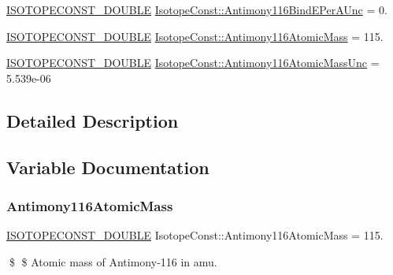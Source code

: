 \begin{DoxyCompactItemize}
\mbox{\hyperlink{group___isotope_const-_macros_ga8f45a7272ce02c0b4c65c44636ed719a}{I\+S\+O\+T\+O\+P\+E\+C\+O\+N\+S\+T\+\_\+\+D\+O\+U\+B\+LE}} \mbox{\hyperlink{group___isotope_const-_antimony-_sb116_ga6096b1154e6456bb81245e9aa87344aa}{Isotope\+Const\+::\+Antimony116\+Bind\+E\+Per\+A\+Unc}} = 0.
\item 
\mbox{\hyperlink{group___isotope_const-_macros_ga8f45a7272ce02c0b4c65c44636ed719a}{I\+S\+O\+T\+O\+P\+E\+C\+O\+N\+S\+T\+\_\+\+D\+O\+U\+B\+LE}} \mbox{\hyperlink{group___isotope_const-_antimony-_sb116_gafb6d793bd27272471c521f25d97593fa}{Isotope\+Const\+::\+Antimony116\+Atomic\+Mass}} = 115.
\item 
\mbox{\hyperlink{group___isotope_const-_macros_ga8f45a7272ce02c0b4c65c44636ed719a}{I\+S\+O\+T\+O\+P\+E\+C\+O\+N\+S\+T\+\_\+\+D\+O\+U\+B\+LE}} \mbox{\hyperlink{group___isotope_const-_antimony-_sb116_ga2a6754222f87f966df9652f883b2963e}{Isotope\+Const\+::\+Antimony116\+Atomic\+Mass\+Unc}} = 5.\+539e-\/06
\end{DoxyCompactItemize}


\subsection{Detailed Description}


\subsection{Variable Documentation}
\mbox{\label{group___isotope_const-_antimony-_sb116_gafb6d793bd27272471c521f25d97593fa}} 
\subsubsection{\texorpdfstring{Antimony116\+Atomic\+Mass}{Antimony116AtomicMass}}
{\footnotesize\ttfamily \mbox{\hyperlink{group___isotope_const-_macros_ga8f45a7272ce02c0b4c65c44636ed719a}{I\+S\+O\+T\+O\+P\+E\+C\+O\+N\+S\+T\+\_\+\+D\+O\+U\+B\+LE}} Isotope\+Const\+::\+Antimony116\+Atomic\+Mass = 115.}

\$ \$ Atomic mass of Antimony-\/116 in amu. \mbox{\label{group___isotope_const-_antimony-_sb116_ga2a6754222f87f966df9652f883b2963e}} 
